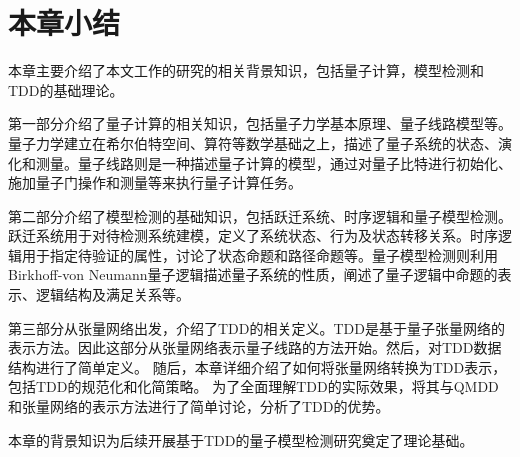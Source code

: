 
\section{本章小结}
本章主要介绍了本文工作的研究的相关背景知识，包括量子计算，模型检测和TDD的基础理论。

第一部分介绍了量子计算的相关知识，包括量子力学基本原理、量子线路模型等。量子力学建立在希尔伯特空间、算符等数学基础之上，描述了量子系统的状态、演化和测量。量子线路则是一种描述量子计算的模型，通过对量子比特进行初始化、施加量子门操作和测量等来执行量子计算任务。

第二部分介绍了模型检测的基础知识，包括跃迁系统、时序逻辑和量子模型检测。跃迁系统用于对待检测系统建模，定义了系统状态、行为及状态转移关系。时序逻辑用于指定待验证的属性，讨论了状态命题和路径命题等。量子模型检测则利用Birkhoff-von Neumann量子逻辑描述量子系统的性质，阐述了量子逻辑中命题的表示、逻辑结构及满足关系等。

第三部分从张量网络出发，介绍了TDD的相关定义。TDD是基于量子张量网络的表示方法。因此这部分从张量网络表示量子线路的方法开始。然后，对TDD数据结构进行了简单定义。
随后，本章详细介绍了如何将张量网络转换为TDD表示，包括TDD的规范化和化简策略。
为了全面理解TDD的实际效果，将其与QMDD和张量网络的表示方法进行了简单讨论，分析了TDD的优势。

本章的背景知识为后续开展基于TDD的量子模型检测研究奠定了理论基础。

